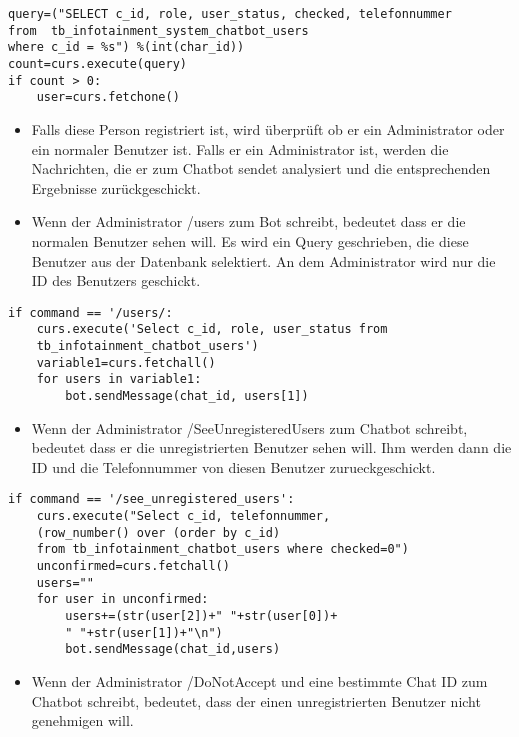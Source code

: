 \begin{lstlisting}[frame=single]
query=("SELECT c_id, role, user_status, checked, telefonnummer 
from  tb_infotainment_system_chatbot_users 
where c_id = %s") %(int(char_id))
count=curs.execute(query)
if count > 0:
	user=curs.fetchone()
\end{lstlisting}
\begin{itemize}
	\item Falls diese Person registriert ist, wird überprüft ob er ein Administrator oder ein normaler Benutzer ist. Falls er ein Administrator ist, werden die Nachrichten, die er zum Chatbot sendet analysiert und die entsprechenden Ergebnisse zurückgeschickt. 
\end{itemize}	
\begin{itemize}
	\item Wenn der Administrator /users zum Bot schreibt, bedeutet dass er die normalen Benutzer sehen will. Es wird ein Query geschrieben, die diese Benutzer aus der Datenbank selektiert. An dem Administrator wird nur die ID des Benutzers geschickt.
\end{itemize}
\begin{lstlisting}[frame=single]
if command == '/users/:
	curs.execute('Select c_id, role, user_status from 
	tb_infotainment_chatbot_users')
	variable1=curs.fetchall()
	for users in variable1:
		bot.sendMessage(chat_id, users[1])
\end{lstlisting}
\begin{itemize}
	\item Wenn der Administrator /SeeUnregisteredUsers zum Chatbot schreibt, bedeutet dass er die unregistrierten Benutzer sehen will. Ihm werden dann die ID und die Telefonnummer von diesen Benutzer zurueckgeschickt. 
\end{itemize}
\begin{lstlisting}[frame=single]
if command == '/see_unregistered_users':
	curs.execute("Select c_id, telefonnummer,
	(row_number() over (order by c_id) 
	from tb_infotainment_chatbot_users where checked=0")
	unconfirmed=curs.fetchall()
	users=""
	for user in unconfirmed:
		users+=(str(user[2])+" "+str(user[0])+
		" "+str(user[1])+"\n")
		bot.sendMessage(chat_id,users)
\end{lstlisting}
\begin{itemize}
	\item Wenn der Administrator /DoNotAccept und eine bestimmte Chat ID zum Chatbot schreibt, bedeutet, dass der einen unregistrierten Benutzer nicht genehmigen will. 
\end{itemize}	
